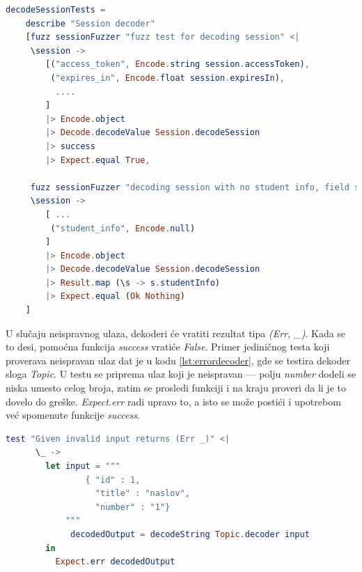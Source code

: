 \documentclass[12pt,oneside]{memoir}
\begin{document}
\begin{lstlisting}[language=elm, caption={Implementacija testova za funkciju \emph{decodeSession}},captionpos=b, label={lst:testdecode}]
decodeSessionTests = 
    describe "Session decoder"
    [fuzz sessionFuzzer "fuzz test for decoding session" <| 
     \session -> 
        [("access_token", Encode.string session.accessToken),
         ("expires_in", Encode.float session.expiresIn),
          .... 
        ]
        |> Encode.object
        |> Decode.decodeValue Session.decodeSession
        |> success
        |> Expect.equal True, 
         
     fuzz sessionFuzzer "decoding session with no student info, field should be Nothing" <| 
     \session -> 
        [ ...
         ("student_info", Encode.null)
        ]
        |> Encode.object
        |> Decode.decodeValue Session.decodeSession
        |> Result.map (\s -> s.studentInfo)
        |> Expect.equal (Ok Nothing)
    ]
\end{lstlisting}

\par U slučaju neispravnog ulaza, dekoderi će vratiti rezultat tipa \emph{(Err, \_)}. Kada se to desi, pomoćna funkcija \emph{success} vratiće \emph{False}. Primer jediničnog testa koji proverava neispravan ulaz dat je u kodu \ref{lst:errordecoder}, gde se testira dekoder sloga \emph{Topic}. U testu se priprema ulaz koji je neispravan --- polju \emph{number} dodeli se niska umesto celog broja, zatim se prosledi funkciji i na kraju proveri da li je to dovelo do greške. \emph{Expect.err} radi upravo to, a isto se može postići i upotrebom već spomenute funkcije \emph{success}.

\begin{lstlisting}[language=elm, caption={Implementacija testa koji izaziva grešku na primeru funkcije \emph{Topic.decoder}},captionpos=b, label={lst:errordecoder}]
test "Given invalid input returns (Err _)" <|
      \_ -> 
        let input = """
                { "id" : 1,
                  "title" : "naslov",
                  "number" : "1"} 
            """
             decodedOutput = decodeString Topic.decoder input
        in 
          Expect.err decodedOutput
\end{lstlisting}
\end{document}
